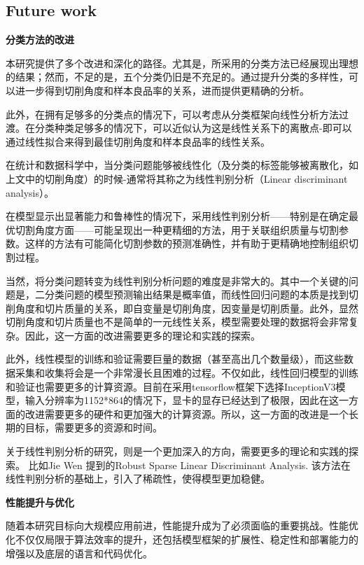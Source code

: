 \subsection{Future work}

\textbf{分类方法的改进}

本研究提供了多个改进和深化的路径。尤其是，所采用的分类方法已经展现出理想的结果；然而，不足的是，五个分类仍旧是不充足的。通过提升分类的多样性，可以进一步得到切削角度和样本良品率的关系，进而提供更精确的分析。

此外，在拥有足够多的分类点的情况下，可以考虑从分类框架向线性分析方法过渡。在分类种类足够多的情况下，可以近似认为这是线性关系下的离散点-即可以通过线性拟合来得到最佳切削角度和样本良品率的线性关系。

在统计和数据科学中，当分类问题能够被线性化（及分类的标签能够被离散化，如上文中的切削角度）的时候-通常将其称之为线性判别分析（Linear discriminant analysis）。

在模型显示出显著能力和鲁棒性的情况下，采用线性判别分析——特别是在确定最优切割角度方面——可能呈现出一种更精细的方法，用于关联组织质量与切割参数。这样的方法有可能简化切割参数的预测准确性，并有助于更精确地控制组织切割过程。

当然，将分类问题转变为线性判别分析问题的难度是非常大的。其中一个关键的问题是，二分类问题的模型预测输出结果是概率值，而线性回归问题的本质是找到切削角度和切片质量的关系，即自变量是切削角度，因变量是切削质量。此外，显然切削角度和切片质量也不是简单的一元线性关系，模型需要处理的数据将会非常复杂。因此，这一方面的改进需要更多的理论和实践的探索。

此外，线性模型的训练和验证需要巨量的数据（甚至高出几个数量级），而这些数据采集和收集将会是一个非常漫长且困难的过程。不仅如此，线性回归模型的训练和验证也需要更多的计算资源。目前在采用tensorflow框架下选择InceptionV3模型，输入分辨率为1152*864的情况下，显卡的显存已经达到了极限，因此在这一方面的改进需要更多的硬件和更加强大的计算资源。所以，这一方面的改进是一个长期的目标，需要更多的资源和时间。

关于线性判别分析的研究，则是一个更加深入的方向，需要更多的理论和实践的探索。
比如Jie Wen 提到的Robust Sparse Linear Discriminant Analysis\cite{6.1}. 该方法在线性判别分析的基础上，引入了稀疏性，使得模型更加稳健。




\textbf{性能提升与优化}

随着本研究目标向大规模应用前进，性能提升成为了必须面临的重要挑战。性能优化不仅仅局限于算法效率的提升，还包括模型框架的扩展性、稳定性和部署能力的增强以及底层的语言和代码优化。

